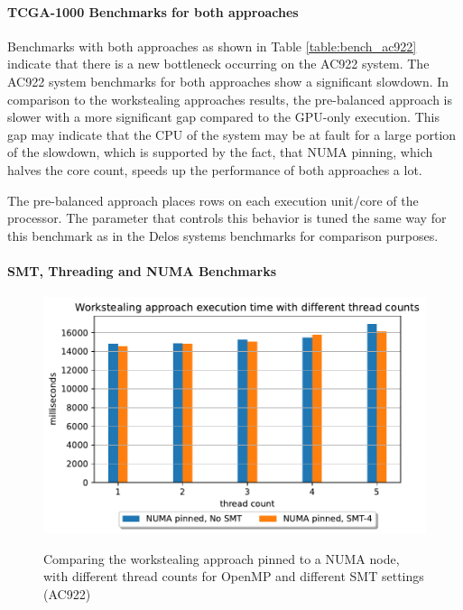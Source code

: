 \paragraph{TCGA-1000 Benchmarks for both approaches}


Benchmarks with both approaches as shown in Table \ref{table:bench_ac922} indicate that there is a new bottleneck occurring on the AC922 system. The AC922 system benchmarks for both approaches show a significant slowdown. In comparison to the workstealing approaches results, the pre-balanced approach is slower with a more significant gap compared to the GPU-only execution. This gap may indicate that the CPU of the system may be at fault for a large portion of the slowdown, which is supported by the fact, that NUMA pinning, which halves the core count, speeds up the performance of both approaches a lot.

The pre-balanced approach places rows on each execution unit/core of the processor. The parameter that controls this behavior is tuned the same way for this benchmark as in the Delos systems benchmarks for comparison purposes.


\paragraph{SMT, Threading and NUMA Benchmarks}
\begin{figure}[H]
  \caption{Comparing the workstealing approach pinned to a NUMA node, with different thread counts for OpenMP and different SMT settings (AC922)}
  \includegraphics[width=\textwidth]{figures/ac922_threadcount.pdf}
  \centering
  \label{fig:threadcount_ac922}
\end{figure}

